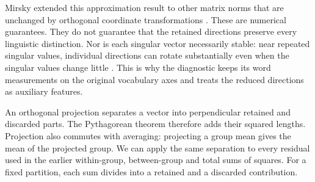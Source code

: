\documentclass[10pt,letterpaper]{article}
\begin{document}
Mirsky extended this approximation result to other matrix norms that are unchanged by orthogonal coordinate transformations \cite{mirsky}. These are numerical guarantees. They do not guarantee that the retained directions preserve every linguistic distinction. Nor is each singular vector necessarily stable: near repeated singular values, individual directions can rotate substantially even when the singular values change little \cite{stewart}. This is why the diagnostic keeps its word measurements on the original vocabulary axes and treats the reduced directions as auxiliary features.\par

An orthogonal projection separates a vector into perpendicular retained and discarded parts. The Pythagorean theorem therefore adds their squared lengths. Projection also commutes with averaging: projecting a group mean gives the mean of the projected group. We can apply the same separation to every residual used in the earlier within-group, between-group and total sums of squares. For a fixed partition, each sum divides into a retained and a discarded contribution.\par
\end{document}
